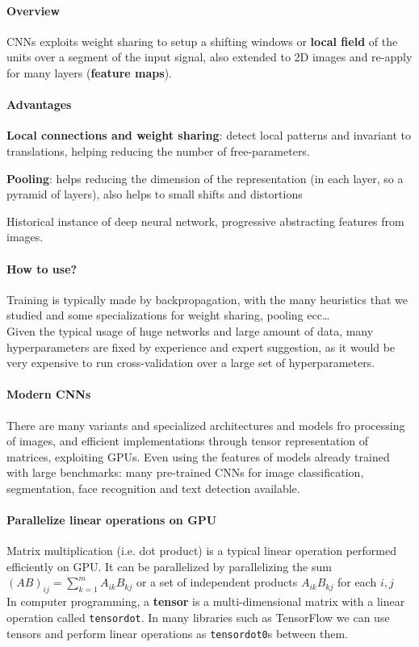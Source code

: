 \documentclass[10pt]{report}
\begin{document}
\paragraph{Overview} CNNs exploits weight sharing to setup a shifting windows or \textbf{local field} of the units over a segment of the input signal, also extended to 2D images and re-apply for many layers (\textbf{feature maps}).
\paragraph{Advantages}
\begin{list}{}{}
	\item \textbf{Local connections and weight sharing}: detect local patterns and invariant to translations, helping reducing the number of free-parameters.
	\item \textbf{Pooling}: helps reducing the dimension of the representation (in each layer, so a pyramid of layers), also helps to small shifts and distortions
	\item Historical instance of deep neural network, progressive abstracting features from images.
\end{list}
\paragraph{How to use?} Training is typically made by backpropagation, with the many heuristics that we studied and some specializations for weight sharing, pooling ecc\ldots\\
Given the typical usage of huge networks and large amount of data, many hyperparameters are fixed by experience and expert suggestion, as it would be very expensive to run cross-validation over a large set of hyperparameters.
\paragraph{Modern CNNs} There are many variants and specialized architectures and models fro processing of images, and efficient implementations through tensor representation of matrices, exploiting GPUs. Even using the features of models already trained with large benchmarks: many pre-trained CNNs for image classification, segmentation, face recognition and text detection available.
\paragraph{Parallelize linear operations on GPU} Matrix multiplication (i.e. dot product) is a typical linear operation performed efficiently on GPU. It can be parallelized by parallelizing the sum $(AB)_{ij} = \sum_{k=1}^m A_{ik}B_{kj}$ or a set of independent products $A_{ik}B_{kj}$ for each $i,j$\\
In computer programming, a \textbf{tensor} is a multi-dimensional matrix with a linear operation called \texttt{tensordot}. In many libraries such as TensorFlow we can use tensors and perform linear operations as \texttt{tensordot0}s between them.
\end{document}
